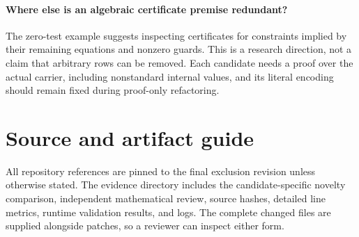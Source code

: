 \documentclass[11pt]{article}
\begin{document}
\paragraph{Where else is an algebraic certificate premise redundant?}
The zero-test example suggests inspecting certificates for constraints implied
by their remaining equations and nonzero guards. This is a research direction,
not a claim that arbitrary rows can be removed. Each candidate needs a proof
over the actual carrier, including nonstandard internal values, and its
literal encoding should remain fixed during proof-only refactoring.

\section*{Source and artifact guide}

All repository references are pinned to the final exclusion revision unless
otherwise stated. The evidence directory includes the candidate-specific
novelty comparison, independent mathematical review, source hashes, detailed
line metrics, runtime validation results, and logs. The complete changed
files are supplied alongside patches, so a reviewer can inspect either form.
\end{document}
